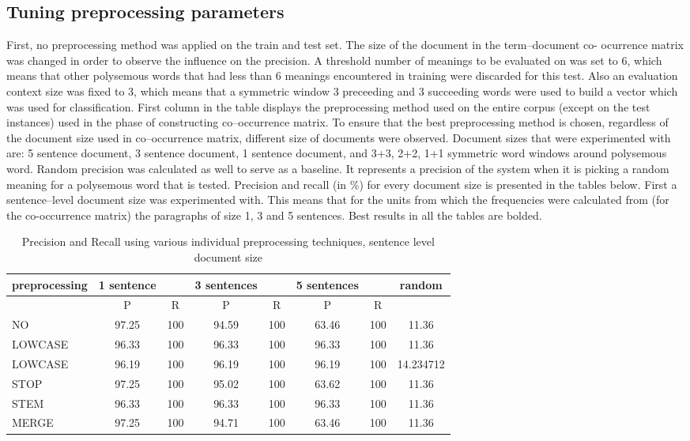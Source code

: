 \subsection{Tuning preprocessing parameters}
First, no preprocessing method was applied on the train and test set. The size of the document in the term--document co-
ocurrence matrix was changed in order to observe the influence on the precision. A threshold number of meanings to be evaluated on was set to 6, which means that other polysemous words that had less than 6 meanings encountered in training were discarded for this test. Also an evaluation context size was fixed to 3, which means that a symmetric window 3 preceeding and 3 succeeding words were used to build a vector which was used for classification. First column in the table displays the preprocessing method used on the entire corpus (except on the test instances) used in the phase of constructing co--occurrence matrix. To ensure that the best preprocessing method is chosen, regardless of the 
document size used in co--occurrence matrix, different size of documents were observed. Document sizes that were
experimented with are: 5 sentence document, 3 sentence document, 1 sentence document, and 3+3, 2+2, 1+1 symmetric word windows around polysemous word.  
Random precision was calculated as well to serve as a baseline. It represents a precision of the system when it is picking a random meaning for a polysemous word that is tested. 
Precision and recall (in \%) for every document size is presented in the tables below. First a sentence--level 
document size was experimented with. This means that for the units from which the frequencies were calculated from (for the co-occurrence matrix) the paragraphs of size 1, 3 and 5 sentences. 
Best results in all the tables are bolded. 

\begin{table}[h!]
\begin{tabular}{ l | c c | c c | c c | c}
   preprocessing &  1 sentence && 3 sentences && 5 sentences  && random\\
\hline
	& P  &  R & P  &  R & P  &  R &\\
\hline\hline
NO  & 97.25 & 100 & 94.59 & 100 & 63.46 & 100 &11.36 \\
LOWCASE  & 96.33 & 100 & 96.33 & 100 & 96.33 & 100 & 11.36 \\
LOWCASE  & 96.19 & 100 & 96.19 & 100 & 96.19 & 100 & 14.234712 \\
STOP  & 97.25 & 100 & 95.02 & 100 & 63.62 & 100 & 11.36 \\
STEM  & 96.33 & 100 & 96.33 & 100 & 96.33 & 100 & 11.36 \\
MERGE  & 97.25 & 100 & 94.71 & 100 & 63.46 & 100 & 11.36 \\
\end{tabular}
\caption{Precision and Recall using various individual preprocessing techniques, sentence level document size}
\end{table}

